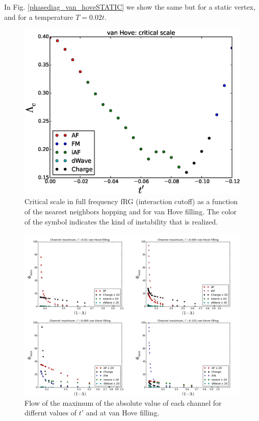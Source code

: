 In Fig. \ref{phasediag_van_hoveSTATIC} we show the same but for a static vertex, and for a temperature $T= 0.02t$. 
\begin{figure}
\includegraphics[scale=0.7]{vanHove_scan_critical_lambda_phi.eps}
\caption{Critical scale in full frequency fRG (interaction cutoff) as a function of the nearest neighbors hopping and for van Hove filling. The color of the symbol indicates the kind of instability that is realized.  } \label{phasediag_van_hove}

\end{figure}


\begin{figure}
\includegraphics[scale=0.32,angle = 90]{images/vanhovelam.png}
\caption{Flow of the maximum of the absolute value of each channel for differnt values of $t'$ and at van Hove filling.
} 
\label{lamvan} 
\end{figure}


